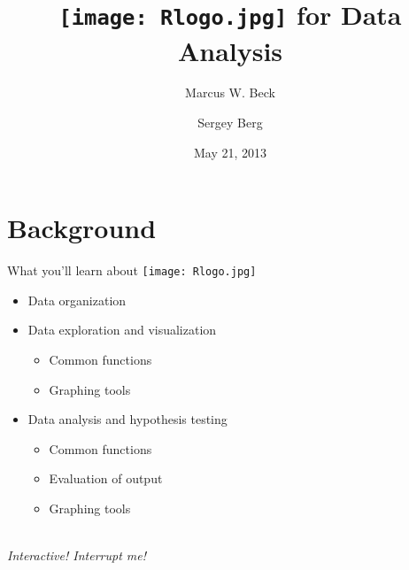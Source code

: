 \documentclass[xcolor=svgnames]{beamer}
\begin{document}

\title[R for Data Analysis]{\texttt{[image: Rlogo.jpg]} \hspace{0.2em} for Data Analysis}
\author[M. Beck and S. Berg]{Marcus W. Beck \and Sergey Berg}


\date{May 21, 2013}


\begin{frame}
\vspace{-0.3in}
\titlepage
\end{frame}

\section{Background}

\begin{frame}{What you'll learn about \hspace{0.2em}\texttt{[image: Rlogo.jpg]}}
\begin{itemize}
\itemsep20pt
\item Data organization
\item Data exploration and visualization
\begin{itemize}
\item Common functions
\item Graphing tools
\end{itemize}
\item Data analysis and hypothesis testing
\begin{itemize}
\item Common functions
\item Evaluation of output 
\item Graphing tools \\~\\
\end{itemize}
\end{itemize}
\pause
\Large
\centerline{\emph{Interactive! Interrupt me!}}
\end{frame}
\end{document}
